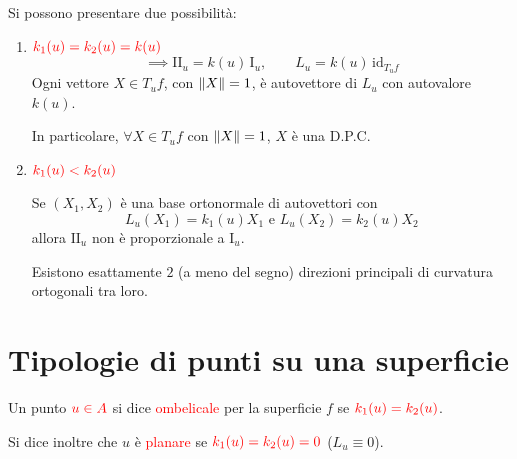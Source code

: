         \begin{osservazione}
        \label{oss:direzioni_principali_di_curvatura}
        Si possono presentare due possibilità:
        \begin{enumerate}
            \item[\textcolor{red}{\text{1)}}] $\textcolor{red}{k_1(u) = k_2(u) = k(u)}$
            \[
            \implies \mathrm{II}_u = k(u)\,\mathrm{I}_u, \qquad L_u = k(u)\,\mathrm{id}_{T_u f}
            \]
            Ogni vettore $X \in T_u f$, con $\lVert X\rVert = 1$, è autovettore di $L_u$ con autovalore $k(u)$. 
            
            In particolare, $\forall X \in T_u f$ con $\lVert X\rVert = 1$, $X$ è una D.P.C.
            
            \item[\textcolor{red}{\text{2)}}] $\textcolor{red}{k_1(u) < k_2(u)}$
            
            Se $(X_1, X_2)$ è una base ortonormale di autovettori con 
            \[ L_u(X_1) = k_1(u)X_1 \text{ e } L_u(X_2) = k_2(u)X_2 \]
            allora $\mathrm{II}_u$ non è proporzionale a $\mathrm{I}_u$. 
            
            Esistono esattamente $2$ (a meno del segno) direzioni principali di curvatura ortogonali tra loro.
        \end{enumerate}
        \end{osservazione}
    \section{Tipologie di punti su una superficie}
        \begin{definizione}
        \mbox{}

        Un punto $\textcolor{red}{u \in A}$ si dice \textcolor{red}{ombelicale} per la superficie $f$ se $\textcolor{red}{k_1(u) = k_2(u)}$.

        Si dice inoltre che $u$ è \textcolor{red}{planare} se $\textcolor{red}{k_1(u) = k_2(u) = 0}$
        \textcolor{blu}{($L_u \equiv 0$)}.
        \end{definizione}

